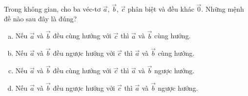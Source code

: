 \begin{bt}%

Trong không gian, cho ba véc-tơ $\overrightarrow{a}$, $\overrightarrow{b}$, $\overrightarrow{c}$ phân biệt và đều khác $\overrightarrow{0}$. Những mệnh đề nào sau đây là đúng?
	\begin{enumerate}[a)]	
		\item Nếu $\overrightarrow{a}$ và $\overrightarrow{b}$ đều cùng hướng với $\overrightarrow{c}$ thì $\overrightarrow{a}$ và $\overrightarrow{b}$ cùng hướng.
	\item 	Nếu $\overrightarrow{a}$ và $\overrightarrow{b}$ đều ngược hướng với $\overrightarrow{c}$ thì $\overrightarrow{a}$ và $\overrightarrow{b}$ cùng hướng.
\item 		Nếu $\overrightarrow{a}$ và $\overrightarrow{b}$ đều cùng hướng với $\overrightarrow{c}$ thì $\overrightarrow{a}$ và $\overrightarrow{b}$ ngược hướng.
\item 		Nếu $\overrightarrow{a}$ và $\overrightarrow{b}$ đều ngược hướng với $\overrightarrow{c}$ thì $\overrightarrow{a}$ và $\overrightarrow{b}$ ngược hướng.
	\end{enumerate}
\end{bt}

